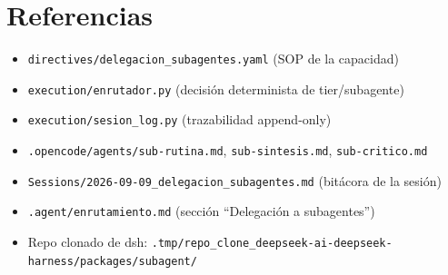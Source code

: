 \documentclass[11pt,a4paper]{article}
\begin{document}
\section*{Referencias}

\begin{itemize}[leftmargin=16pt, itemsep=2pt, topsep=2pt]
  \item \texttt{directives/delegacion\_subagentes.yaml} (SOP de la capacidad)
  \item \texttt{execution/enrutador.py} (decisión determinista de tier/subagente)
  \item \texttt{execution/sesion\_log.py} (trazabilidad append-only)
  \item \texttt{.opencode/agents/sub-rutina.md}, \texttt{sub-sintesis.md}, \texttt{sub-critico.md}
  \item \texttt{Sessions/2026-09-09\_delegacion\_subagentes.md} (bitácora de la sesión)
  \item \texttt{.agent/enrutamiento.md} (sección ``Delegación a subagentes'')
  \item Repo clonado de dsh: \texttt{.tmp/repo\_clone\_deepseek-ai-deepseek-harness/packages/subagent/}
\end{itemize}
\end{document}

